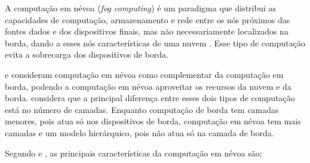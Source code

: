 A computação em névoa (\emph{fog computing}) é um paradigma que distribui
as capacidades de computação, armazenamento e rede entre os nós próximos
das fontes dados
e dos dispositivos finais, mas não necessariamente localizados na borda,
dando a esses nós características de uma nuvem
\cite{Bonomi2012,Dastjerdi2016,IEEECommunicationsSociety2018}.
Esse tipo de computação evita a sobrecarga dos dispositivos de borda.

 e
 consideram computação em névoa como complementar da
computação em borda, podendo a computação em névoa aproveitar os recursos da
nuvem e da borda.
 considera que a
principal diferença entre esses dois tipos de computação está no número de
camadas.
Enquanto computação de borda tem
camadas menores, pois atua só nos
dispositivos de borda, computação em névoa tem mais camadas e um modelo
hierárquico, pois não atua só na camada de borda.

Segundo  e , as principais
características da computação em névoa são:

